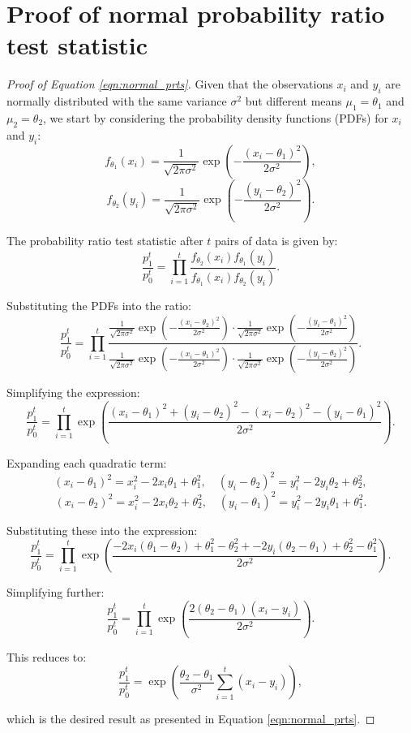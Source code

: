 \documentclass[magisterska, english]{pwr_wmat_praca_dyplomowa}
\theoremstyle{plain}
\numberwithin{theorem}{chapter}
\theoremstyle{definition}
\numberwithin{theorem}{chapter}
\begin{document}
\section{Proof of normal probability ratio test statistic}\label{proof:normal_prts}


\begin{proof}[Proof of Equation \eqref{eqn:normal_prts}]
	
	Given that the observations \(x_i\) and \(y_i\) are normally distributed with the same variance \(\sigma^2\) but different means \(\mu_1 = \theta_1\) and \(\mu_2 = \theta_2\), we start by considering the probability density functions (PDFs) for \(x_i\) and \(y_i\):
	\[
	f_{\theta_1}(x_i) = \frac{1}{\sqrt{2\pi\sigma^2}} \exp\left(-\frac{(x_i - \theta_1)^2}{2\sigma^2}\right),
	\]
	\[
	f_{\theta_2}(y_i) = \frac{1}{\sqrt{2\pi\sigma^2}} \exp\left(-\frac{(y_i - \theta_2)^2}{2\sigma^2}\right).
	\]
	
	The probability ratio test statistic after \(t\) pairs of data is given by:
	\[
	\frac{p_1^t}{p_0^t} = \prod_{i=1}^{t} \frac{f_{\theta_2}(x_i) f_{\theta_1}(y_i)}{f_{\theta_1}(x_i) f_{\theta_2}(y_i)}.
	\]
	
	Substituting the PDFs into the ratio:
	\[
	\frac{p_1^t}{p_0^t} = \prod_{i=1}^{t} \frac{\frac{1}{\sqrt{2\pi\sigma^2}} \exp\left(-\frac{(x_i - \theta_2)^2}{2\sigma^2}\right) \cdot \frac{1}{\sqrt{2\pi\sigma^2}} \exp\left(-\frac{(y_i - \theta_1)^2}{2\sigma^2}\right)}{\frac{1}{\sqrt{2\pi\sigma^2}} \exp\left(-\frac{(x_i - \theta_1)^2}{2\sigma^2}\right) \cdot \frac{1}{\sqrt{2\pi\sigma^2}} \exp\left(-\frac{(y_i - \theta_2)^2}{2\sigma^2}\right)}.
	\]
	
	Simplifying the expression:
	\[
	\frac{p_1^t}{p_0^t} = \prod_{i=1}^{t} \exp\left(\frac{(x_i - \theta_1)^2 + (y_i - \theta_2)^2 - (x_i - \theta_2)^2 - (y_i - \theta_1)^2}{2\sigma^2}\right).
	\]
	
	Expanding each quadratic term:
	\[
	(x_i - \theta_1)^2 = x_i^2 - 2x_i\theta_1 + \theta_1^2, \quad
	(y_i - \theta_2)^2 = y_i^2 - 2y_i\theta_2 + \theta_2^2,
	\]
	\[
	(x_i - \theta_2)^2 = x_i^2 - 2x_i\theta_2 + \theta_2^2,\quad
	(y_i - \theta_1)^2 = y_i^2 - 2y_i\theta_1 + \theta_1^2.
	\]
	
	Substituting these into the expression:
	\[
	\frac{p_1^t}{p_0^t} = \prod_{i=1}^{t} \exp\left(\frac{-2x_i(\theta_1 - \theta_2) + \theta_1^2 - \theta_2^2 + -2y_i(\theta_2 - \theta_1) + \theta_2^2 - \theta_1^2}{2\sigma^2}\right).
	\]
	
	Simplifying further:
	\[
	\frac{p_1^t}{p_0^t} = \prod_{i=1}^{t} \exp\left(\frac{2(\theta_2 - \theta_1)(x_i - y_i)}{2\sigma^2}\right).
	\]
	
	This reduces to:
	\[
	\frac{p_1^t}{p_0^t} = \exp\left(\frac{\theta_2 - \theta_1}{\sigma^2} \sum_{i=1}^{t} (x_i - y_i)\right),
	\]
	
	which is the desired result as presented in Equation \eqref{eqn:normal_prts}.
\end{proof}
\end{document}
